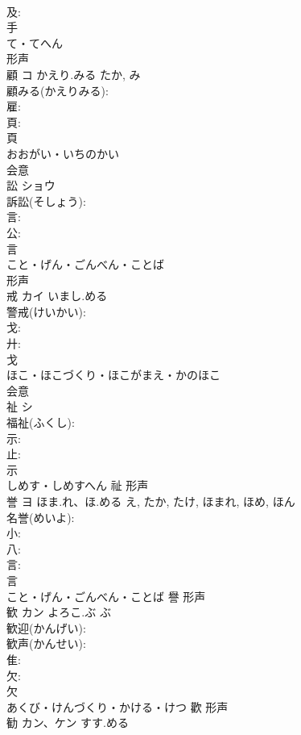 \documentclass[8pt]{extreport}
\begin{document}
\begin{CJK}{UTF8}{min}
\\	及: 
\\	手	
\\	て・てへん	
\\	形声 
\\	顧	コ	かえり.みる	たか, み	
\\	顧みる(かえりみる): 
\\	雇: 
\\	頁: 
\\	頁	
\\	おおがい・いちのかい	
\\	会意 
\\	訟	ショウ			
\\	訴訟(そしょう): 
\\	言: 
\\	公: 
\\	言	
\\	こと・げん・ごんべん・ことば	
\\	形声 
\\	戒	カイ	いまし.める		
\\	警戒(けいかい): 
\\	戈: 
\\	廾: 
\\	戈	
\\	ほこ・ほこづくり・ほこがまえ・かのほこ	
\\	会意 
\\	祉	シ			
\\	福祉(ふくし): 
\\	示: 
\\	止: 
\\	示	
\\	しめす・しめすへん	祉	形声 
\\	誉	ヨ	ほま.れ、ほ.める	え, たか, たけ, ほまれ, ほめ, ほん	
\\	名誉(めいよ): 
\\	小: 
\\	八: 
\\	言: 
\\	言	
\\	こと・げん・ごんべん・ことば	譽	形声 
\\	歓	カン	よろこ.ぶ	ぶ	
\\	歓迎(かんげい): 
\\	歓声(かんせい): 
\\	隹: 
\\	欠: 
\\	欠	
\\	あくび・けんづくり・かける・けつ	歡	形声 
\\	勧	カン、ケン	すす.める		

\end{CJK}
\end{document}
